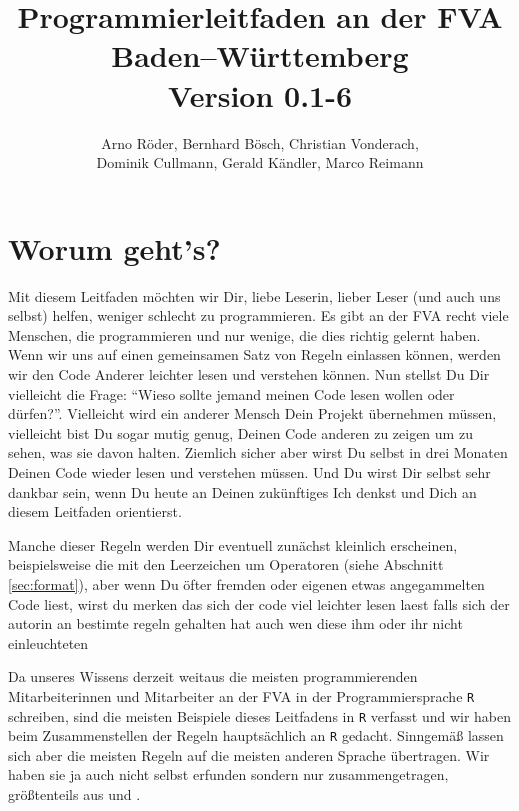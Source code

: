 \documentclass[twoside]{scrartcl}
\providecommand{\R}{\texttt{R}}
\begin{document}


\title{Programmierleitfaden an der FVA Baden--W\"u{}rttemberg\\
\vspace{1cm}
\small{Version 0.1-6}}
\author{Arno R\"oder, Bernhard B\"o{}sch, Christian Vonderach,\\Dominik Cullmann,
Gerald K\"a{}ndler, Marco Reimann}
\maketitle
\tableofcontents
\thispagestyle{fancy}
\section{Worum geht's?}
Mit diesem Leitfaden m\"o{}chten wir Dir, liebe Leserin, lieber Leser (und auch
uns selbst) helfen, weniger schlecht zu programmieren.
Es gibt an der FVA recht viele Menschen, die programmieren und nur wenige, die
dies richtig gelernt haben. Wenn wir uns auf einen gemeinsamen Satz von Regeln
einlassen k\"o{}nnen, werden wir den Code Anderer leichter lesen und verstehen
k\"o{}nnen.
Nun stellst Du Dir vielleicht die Frage: "`Wieso sollte jemand meinen Code lesen
wollen oder d\"u{}rfen?"'. Vielleicht wird ein anderer Mensch Dein Projekt
\"u{}bernehmen m\"u{}ssen, vielleicht bist Du sogar mutig genug, Deinen Code
anderen zu zeigen um zu sehen, was sie davon halten. Ziemlich sicher aber wirst
Du selbst in drei Monaten Deinen Code wieder lesen und verstehen m\"u{}ssen. Und
Du wirst Dir selbst sehr dankbar sein, wenn Du heute an Deinen zuk\"u{}nftiges
Ich denkst und Dich an diesem Leitfaden orientierst.

Manche dieser Regeln werden Dir eventuell zun\"a{}chst kleinlich erscheinen,
beispielsweise die mit den Leerzeichen  um  Operatoren (siehe Abschnitt
\ref{sec:format}), aber wenn Du \"o{}fter fremden oder eigenen etwas
angegammelten Code liest, wirst
du merken das sich der code viel leichter lesen laest falls sich der autorin  an
bestimte regeln gehalten hat auch wen diese ihm oder ihr nicht einleuchteten

Da unseres Wissens derzeit weitaus die meisten programmierenden Mitarbeiterinnen
und Mitarbeiter an der FVA in der Programmiersprache \R{} schreiben, sind die
meisten Beispiele dieses Leitfadens in \R{} verfasst und wir haben beim
Zusammenstellen der Regeln haupts\"a{}chlich an \R{} gedacht.
Sinngem\"a{}\ss{} lassen sich aber die meisten Regeln auf die meisten
anderen Sprache \"u{}bertragen. Wir haben sie ja auch nicht selbst erfunden
sondern nur zusammengetragen, gr\"o{}\ss{}tenteils aus \cite{cc} und \cite{wsp}.
\end{document}
